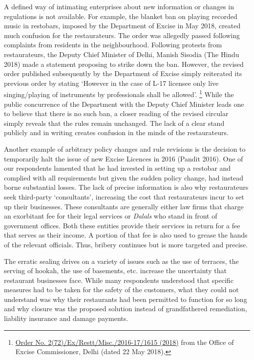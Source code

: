 \documentclass[a4paper, 12pt]{article}
\begin{document}
		A defined way of intimating enterprises about new information or changes in regulations is not available. For example, the blanket ban on playing recorded music in restobars, imposed by the Department of Excise in May 2018, created much confusion 
for the restaurateurs. The order was allegedly passed following complaints from residents in the neighbourhood. Following protests from restaurateurs, the Deputy Chief Minister of Delhi, Manish Sisodia (The Hindu 2018) made a statement proposing to strike down 
the ban. However, the revised order published subsequently by the Department of Excise simply reiterated its previous order by stating ‘However in the case of L-17 licensee only live singing/playing of instruments by professionals shall be allowed’.
\footnote{\href{https://bit.ly/2QxMK56}{Order No. 2(72)/Ex/Restt/Misc./2016-17/1615 (2018)} from the Office of Excise Commissioner, Delhi (dated 22 May 2018).}  While the public concurrence of the Department with the Deputy Chief Minister leads one to believe 
that there is no such ban, a closer reading of the revised circular simply reveals that the rules remain unchanged. The lack of a clear stand publicly and in writing creates confusion in the minds of the restaurateurs.
		
		Another example of arbitrary policy changes and rule revisions is the decision to temporarily halt the issue of new Excise Licences in 2016 (Pandit 2016). One of our respondents lamented that he had invested in setting up a restobar and complied with 
all requirements but given the sudden policy change, had instead borne substantial losses. The lack of precise information is also why restaurateurs seek third-party ‘consultants’, increasing the cost that restaurateurs incur to set up their businesses. These 
consultants are generally either law firms that charge an exorbitant fee for their legal services or \textit{Dalals} who stand in front of government offices. Both these entities provide their services in return for a fee that serves as their income. A portion of that fee is also used to grease the hands of the relevant officials. Thus, bribery continues but is more targeted and precise.
		
		The erratic sealing drives on a variety of issues such as the use of terraces, the serving of hookah, the use of basements, etc. increase the uncertainty that restaurant businesses face. While many respondents understood that specific measures had to 
be taken for the safety of the customers, what they could not understand was why their restaurants had been permitted to function for so long and why closure was the proposed solution instead of grandfathered remediation, liability insurance and damage 
payments.
		
\end{document}
